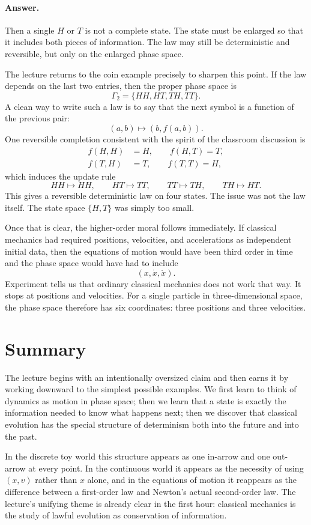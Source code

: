 \paragraph{Answer.} Then a single \(H\) or \(T\) is not a complete state. The state must be enlarged so that it includes both pieces of information. The law may still be deterministic and reversible, but only on the enlarged phase space.

The lecture returns to the coin example precisely to sharpen this point. If the law depends on the last two entries, then the proper phase space is
\begin{equation}
\Gamma_2=\{HH,HT,TH,TT\}.
\end{equation}
A clean way to write such a law is to say that the next symbol is a function of the previous pair:
\[
(a,b)\mapsto (b,f(a,b)).
\]
One reversible completion consistent with the spirit of the classroom discussion is
\[
\begin{aligned}
f(H,H)&=H,\qquad f(H,T)=T,\\
f(T,H)&=T,\qquad f(T,T)=H,
\end{aligned}
\]
which induces the update rule
\begin{equation}
HH\mapsto HH,\qquad
HT\mapsto TT,\qquad
TT\mapsto TH,\qquad
TH\mapsto HT.
\end{equation}
This gives a reversible deterministic law on four states.
The issue was not the law itself.
The state space \(\{H,T\}\) was simply too small.

Once that is clear, the higher-order moral follows immediately. If classical mechanics had required positions, velocities, and accelerations as independent initial data, then the equations of motion would have been third order in time and the phase space would have had to include
\[
(x,\dot{x},\ddot{x}).
\]
Experiment tells us that ordinary classical mechanics does not work that way. It stops at positions and velocities. For a single particle in three-dimensional space, the phase space therefore has six coordinates: three positions and three velocities.

\section{Summary}

The lecture begins with an intentionally oversized claim and then earns it by working downward to the simplest possible examples. We first learn to think of dynamics as motion in phase space; then we learn that a state is exactly the information needed to know what happens next; then we discover that classical evolution has the special structure of determinism both into the future and into the past.

In the discrete toy world this structure appears as one in-arrow and one out-arrow at every point. In the continuous world it appears as the necessity of using \((x,v)\) rather than \(x\) alone, and in the equations of motion it reappears as the difference between a first-order law and Newton's actual second-order law. The lecture's unifying theme is already clear in the first hour: classical mechanics is the study of lawful evolution as conservation of information.
